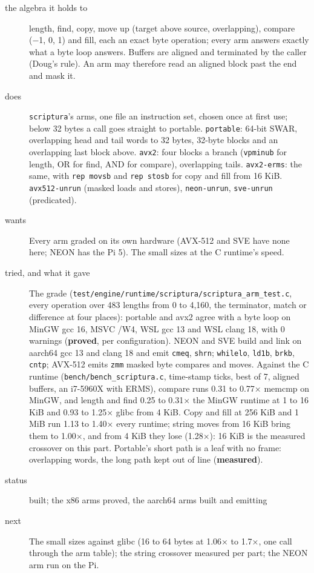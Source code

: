 \begin{description}
\item[{the algebra it holds to}] length, find, copy, move up (target above source, overlapping), compare (−1, 0, 1) and fill, each an exact byte operation; every arm answers exactly what a byte loop answers. Buffers are aligned and terminated by the caller (Doug's rule). An arm may therefore read an aligned block past the end and mask it.
\item[{does}] \texttt{scriptura}'s arms, one file an instruction set, chosen once at first use; below 32 bytes a call goes straight to portable. \texttt{portable}: 64-bit SWAR, overlapping head and tail words to 32 bytes, 32-byte blocks and an overlapping last block above. \texttt{avx2}: four blocks a branch (\texttt{vpminub} for length, OR for find, AND for compare), overlapping tails. \texttt{avx2-\allowbreak{}erms}: the same, with \texttt{rep movsb} and \texttt{rep stosb} for copy and fill from 16 KiB. \texttt{avx512-\allowbreak{}unrun} (masked loads and stores), \texttt{neon-\allowbreak{}unrun}, \texttt{sve-\allowbreak{}unrun} (predicated).
\item[{wants}] Every arm graded on its own hardware (AVX-512 and SVE have none here; NEON has the Pi 5). The small sizes at the C runtime's speed.
\item[{tried, and what it gave}] The grade (\texttt{test/\allowbreak{}engine/\allowbreak{}runtime/\allowbreak{}scriptura/\allowbreak{}scriptura\_\allowbreak{}arm\_\allowbreak{}test.\allowbreak{}c}, every operation over 483 lengths from 0 to 4,160, the terminator, match or difference at four places): portable and avx2 agree with a byte loop on MinGW gcc 16, MSVC /W4, WSL gcc 13 and WSL clang 18, with 0 warnings (\textbf{proved}, per configuration). NEON and SVE build and link on aarch64 gcc 13 and clang 18 and emit \texttt{cmeq}, \texttt{shrn}; \texttt{whilelo}, \texttt{ld1b}, \texttt{brkb}, \texttt{cntp}; AVX-512 emits \texttt{zmm} masked byte compares and moves. Against the C runtime (\texttt{bench/\allowbreak{}bench\_\allowbreak{}scriptura.\allowbreak{}c}, time-stamp ticks, best of 7, aligned buffers, an i7-5960X with ERMS), compare runs 0.31 to 0.77× memcmp on MinGW, and length and find 0.25 to 0.31× the MinGW runtime at 1 to 16 KiB and 0.93 to 1.25× glibc from 4 KiB. Copy and fill at 256 KiB and 1 MiB run 1.13 to 1.40× every runtime; string moves from 16 KiB bring them to 1.00×, and from 4 KiB they lose (1.28×): 16 KiB is the measured crossover on this part. Portable's short path is a leaf with no frame: overlapping words, the long path kept out of line (\textbf{measured}).
\item[{status}] built; the x86 arms proved, the aarch64 arms built and emitting
\item[{next}] The small sizes against glibc (16 to 64 bytes at 1.06× to 1.7×, one call through the arm table); the string crossover measured per part; the NEON arm run on the Pi.
\end{description}

